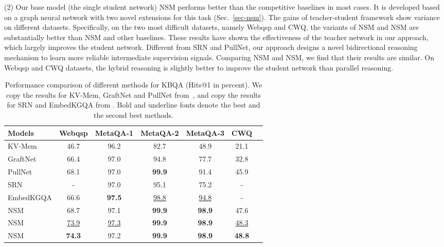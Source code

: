 
(2) Our base model (\ie the single student network) NSM performs better than the competitive baselines in most cases. It is developed based on a graph neural network with two novel extensions for this task (Sec.~\ref{sec-nsm}).  
The gains of teacher-student framework show variance on different datasets. 
Specifically, on the two most difficult datasets, namely Webqsp and CWQ, the variants of NSM and NSM are substantially better than NSM and other baselines. 
These results have shown the effectiveness of the teacher network in our approach, which largely improves the student network. 
Different from SRN and PullNet, our approach designs a novel bidirectional reasoning mechanism to learn more reliable intermediate supervision signals.
Comparing NSM and NSM, we find that their results are similar. On Webqsp and CWQ datasets, the hybrid reasoning is slightly better to improve the student network than parallel reasoning.

\begin{table}[htbp]
	\centering
	\caption{Performance comparison of different methods for KBQA (Hits@1 in percent). We copy the results for KV-Mem, GraftNet and PullNet from~\cite{PullNet-EMNLP-2019}, and copy the results for SRN and EmbedKGQA from \cite{SRN-WSDM-2020,Saxena-ACL-2020}. Bold and underline fonts denote the best and the second best methods.}
	\label{tab:res}\begin{small}
		\begin{tabular}{m{} c c c c c c}
\hline
Models& Webqsp& MetaQA-1& MetaQA-2 & MetaQA-3 & CWQ\\
			\cline{2-6}
\hline
			KV-Mem&	46.7& 96.2& 82.7& 48.9& 21.1\\
			GraftNet &	66.4& 97.0& 94.8& 77.7& 32.8\\
			PullNet &	68.1& 97.0& \textbf{99.9}& 91.4& 45.9\\
			SRN &	-& 97.0& 95.1& 75.2& -\\
			EmbedKGQA&	66.6& \textbf{97.5}& \underline{98.8}& \underline{94.8}& -\\
			\hline
			NSM	&	68.7& 97.1& \textbf{99.9}& \textbf{98.9}&	47.6\\
			\hline
			NSM&	\underline{73.9}& \underline{97.3}& \textbf{99.9}& \textbf{98.9}& \underline{48.3}	\\
			NSM&	\textbf{74.3}& 97.2& \textbf{99.9}& \textbf{98.9}& \textbf{48.8}\\
			\hline
		\end{tabular}\end{small}
\end{table}

